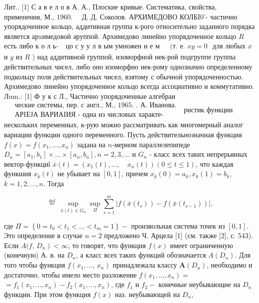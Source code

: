 \documentclass[10pt]{article}
\begin{document}
Лит.. [1] С а в е л о в А. А., Плоские кривые. Систематика, свойства, применения, М., $1960 . \quad$ Д. Д. Соколов. АРХИМЕДОВО КОЛБI0'- частично упорядоченное кольцо, аддитивная группа к-рого относительно заданного порядка является арxимедовой әруппой. Архимедово линейно упорядоченное кольцо $R$ есть либо к о л ь- $\begin{array}{lllll}\text { цо с у у л в ым умножен и е м } & \text { (т. е. } x y=0\end{array}$ для любых $x$ и $y$ из $R$ ) над аддитивной группой, изоморфной нек-рой подгруппе группы действительных чисел, либо оно изоморфно нек-рому однозначно определенному подкольцу поля действительных чисел, взятому с обычной упорядоченностью. Архимедово линейно упорядоченное кольцо всегда ассоциативно и коммутативно. Лum.: [1] Ф у к с Л., Частично упорядоченные алгебраи$\begin{aligned} & \text { ческие системы, пер. с англ., М., 1965. } \text {. А. Иванова. } \\ & \text { АРIЕЈА ВАРИАІИЯ - одна из числовых характе- }\end{aligned}$ ристик функции нескольких переменных, к-рую можно рассматривать как многомерный аналог вариации функции одного переменного. Пусть действительнозначная функция $f(x)=f\left(x_{1}, \ldots, x_{n}\right)$ задана на $n$-мерном параллелепипеде $D_{n}=\left[a_{1}, b_{1}\right] \times \ldots \times\left[a_{n}, b_{n}\right], n=2,3, \ldots$ и $G_{n}$ - класс всех таких непрерывных вектор-функциї $\bar{x}(t)=\left(x_{1}(t), \ldots, \quad x_{n}(t)\right)(0 \leqslant t \leqslant 1)$, что каждая функшия $x_{k}(t)$ не убывает на $[0,1]$, причем $x_{k}(0)=a_{k}, x_{k}(1)=b_{k}$, $k=1,2, \ldots, n$. Тогда



\[

\stackrel{\text { def }}{=} \sup _{\bar{x}(t) \in G_{n}} \sup _{\Pi} \sum_{s=1}^{m}\left|f\left(\bar{x}\left(t_{s}\right)\right)-f\left(\bar{x}\left(t_{s-1}\right)\right)\right|,

\]



где $\Pi=\left\{0=t_{0}<t_{1}<\ldots<t_{m}=1\right\}-$ произвольная система точек из $[0,1]$. Это определение в случае $n=2$ предложено Ч. Арцела [1] (см. также [2], с. 543). Если $A(f$, $\left.D_{n}\right)<\infty$, то говорят, что функция $f(x)$ имеет ограниченную (конечную) А. в. на $D_{n}$, а класс всех таких функций обозначается $A\left(D_{n}\right)$. Для того чтобы функция $f\left(x_{1}, \ldots\right.$, $\left.x_{n}\right)$ принадлежала классу $\boldsymbol{A}\left(D_{n}\right)$, необходимо и достаточно, чтобы имело место разложение $f\left(x_{1}, \ldots, x_{n}\right)=$ $=f_{1}\left(x_{1}, \ldots, x_{n}\right)-f_{2}\left(x_{1}, \ldots, x_{n}\right)$, где $f_{1}$ и $f_{2}-$ конечные неубывающие на $D_{n}$ функции. При этом функция $f(x)$ наз. неубывающей на $D_{n}$,
\end{document}
